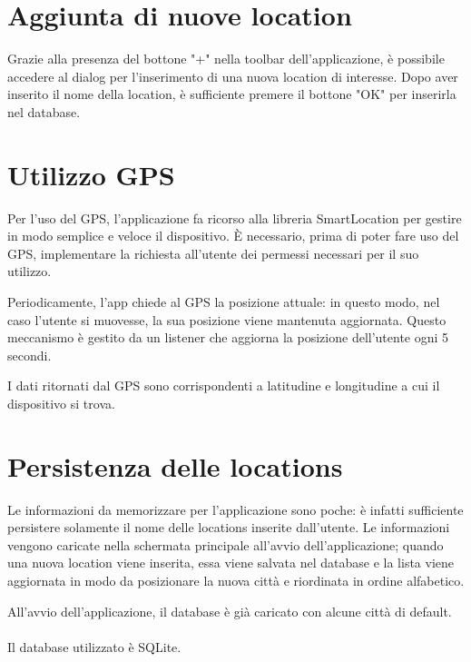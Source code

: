\documentclass[twoside]{supsistudent}
\begin{document}
\section{Aggiunta di nuove location}
Grazie alla presenza del bottone "+" nella toolbar dell'applicazione, è possibile accedere al dialog per l'inserimento di una nuova location di interesse. Dopo aver inserito il nome della location, è sufficiente premere il bottone "OK" per inserirla nel database.

\section{Utilizzo GPS}
Per l'uso del GPS, l'applicazione fa ricorso alla libreria SmartLocation per gestire in modo semplice e veloce il dispositivo. \`E necessario, prima di poter fare uso del GPS, implementare la richiesta all'utente dei permessi necessari per il suo utilizzo.

Periodicamente, l'app chiede al GPS la posizione attuale: in questo modo, nel caso l'utente si muovesse, la sua posizione viene mantenuta aggiornata. Questo meccanismo è gestito da un listener che aggiorna la posizione dell'utente ogni 5 secondi.

I dati ritornati dal GPS sono corrispondenti a latitudine e longitudine a cui il dispositivo si trova.

\section{Persistenza delle locations}
Le informazioni da memorizzare per l'applicazione sono poche: è infatti sufficiente persistere solamente il nome delle locations inserite dall'utente.
Le informazioni vengono caricate nella schermata principale all'avvio dell'applicazione; quando una nuova location viene inserita, essa viene salvata nel database e la lista viene aggiornata in modo da posizionare la nuova città e riordinata in ordine alfabetico.

All'avvio dell'applicazione, il database è già caricato con alcune città di default.
\\\\
Il database utilizzato è SQLite.
\end{document}
